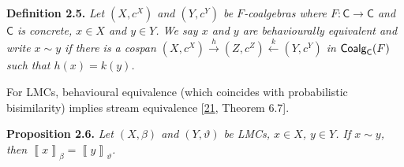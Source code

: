 \documentclass[11pt,a4paper]{amsart}
\begin{document}
\hypertarget{html:S2.Thmtheorem5}{} \par\noindent\textbf{\textbf{Definition 2.5}\textbf{.}}\quad  %
\hypertarget{html:S2.Thmtheorem5.p1}{} \emph{Let %
\hypertarget{html:S2.Thmtheorem5.p1.m1}{}\({(X,c^{X})}\) and %
\hypertarget{html:S2.Thmtheorem5.p1.m2}{}\({(Y,c^{Y})}\) be %
\hypertarget{html:S2.Thmtheorem5.p1.m3}{}\({F}\)-coalgebras where %
\hypertarget{html:S2.Thmtheorem5.p1.m4}{}\({F\colon\mathsf{C}\to\mathsf{C}}\) and %
\hypertarget{html:S2.Thmtheorem5.p1.m5}{}\({\mathsf{C}}\) is concrete, %
\hypertarget{html:S2.Thmtheorem5.p1.m6}{}\({x\in X}\) and %
\hypertarget{html:S2.Thmtheorem5.p1.m7}{}\({y\in Y}\). We say %
\hypertarget{html:S2.Thmtheorem5.p1.m8}{}\({x}\) and %
\hypertarget{html:S2.Thmtheorem5.p1.m9}{}\({y}\) are \emph{behaviourally equivalent} and write %
\hypertarget{html:S2.Thmtheorem5.p1.m10}{}\({x\sim y}\) if there is a cospan %
\hypertarget{html:S2.Thmtheorem5.p1.m11}{}\({(X,c^{X})\stackrel{{\scriptstyle h}}{{\longrightarrow}}(Z,c^{Z})\stackrel{{\scriptstyle k}}{{\longleftarrow}}(Y,c^{Y})}\) in %
\hypertarget{html:S2.Thmtheorem5.p1.m12}{}\({\mbox{\sf Coalg}_{\mathsf{C}}(F)}\) such that %
\hypertarget{html:S2.Thmtheorem5.p1.m13}{}\({h(x)=k(y)}\).}
\par\medskip
\hypertarget{html:S2.SS0.SSS0.P0.SPx3.p4}{} For LMCs, behavioural equivalence (which coincides with probabilistic bisimilarity) implies stream equivalence [\hyperlink{html:bib.bib21}{21}, Theorem 6.7].
\par\medskip
\hypertarget{html:S2.Thmtheorem6}{} \par\noindent\textbf{\textbf{Proposition 2.6}\textbf{.}}\quad  %
\hypertarget{html:S2.Thmtheorem6.p1}{} \emph{Let %
\hypertarget{html:S2.Thmtheorem6.p1.m1}{}\({(X,\beta)}\) and %
\hypertarget{html:S2.Thmtheorem6.p1.m2}{}\({(Y,\vartheta)}\) be LMCs, %
\hypertarget{html:S2.Thmtheorem6.p1.m3}{}\({x\in X}\), %
\hypertarget{html:S2.Thmtheorem6.p1.m4}{}\({y\in Y}\). If %
\hypertarget{html:S2.Thmtheorem6.p1.m5}{}\({x\sim y}\), then %
\hypertarget{html:S2.Thmtheorem6.p1.m6}{}\({\left\llbracket{x}\right\rrbracket_{\beta}=\left\llbracket{y}\right\rrbracket_{\vartheta}}\).}
\end{document}

